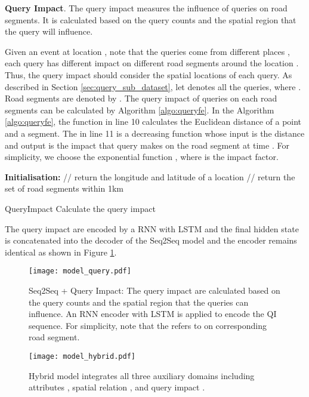 \textbf{Query Impact}. The query impact  measures the influence of queries on road segments. It is calculated based on the query counts and the spatial region that the query will influence. 

Given an event at location , note that the queries come from different places , each query has different impact on different road segments around the location . Thus, the query impact should consider the spatial locations of each query. As described in Section \ref{sec:query_sub_dataset}, let  denotes all the queries, where . Road segments are denoted by . The query impact  of queries on each road segments  can be calculated by Algorithm \ref{algo:queryfe}. In the Algorithm \ref{algo:queryfe}, the function  in line 10 calculates the Euclidean distance of a point and a segment. The  in line 11 is a decreasing function whose input is the distance  and output is the impact  that query  makes on the road segment  at time . For simplicity, we choose the exponential function , where  is the impact factor.

\begin{algorithm}
\DontPrintSemicolon {}
\textbf{Initialisation:}  \;
 {
  // return the longitude and latitude of a location \;
   \;
  \;
  \;
  // return the set of road segments within 1km
  \;
}
\Return{}\;
\caption{{\sc QueryImpact} Calculate the query impact}
\label{algo:queryfe}
\end{algorithm}

The query impact  are encoded by a RNN with LSTM and the final hidden state is concatenated into the decoder of the Seq2Seq model and the encoder remains identical as shown in Figure  \ref{fig:model_query}.

\begin{figure}[htbp]
\centering
\texttt{[image: model\_query.pdf]}
\caption{Seq2Seq + Query Impact: The query impact  are calculated based on the query counts and the spatial region that the queries can influence. An RNN encoder with LSTM is applied to encode the QI sequence. For simplicity, note that the  refers to  on corresponding road segment.}
\label{fig:model_query}
\end{figure}

\begin{figure}[htbp]
\centering
\texttt{[image: model\_hybrid.pdf]}
\caption{Hybrid model integrates all three auxiliary domains including attributes , spatial relation , and query impact .}
\label{fig:model_hybrid}
\end{figure}

